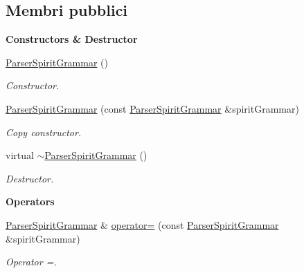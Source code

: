 \subsection*{Membri pubblici}
\begin{Indent}{\bf Constructors \& Destructor}\par
\begin{DoxyCompactItemize}
\item 
\hyperlink{classLifeV_1_1ParserSpiritGrammar_afd12d0ca36622930f0c5e574c96acaa7}{Parser\-Spirit\-Grammar} ()
\begin{DoxyCompactList}\small\item\em Constructor. \end{DoxyCompactList}\item 
\hyperlink{classLifeV_1_1ParserSpiritGrammar_a2a0d8a4396ae61a66edc4f320d9e79f5}{Parser\-Spirit\-Grammar} (const \hyperlink{classLifeV_1_1ParserSpiritGrammar}{Parser\-Spirit\-Grammar} \&spirit\-Grammar)
\begin{DoxyCompactList}\small\item\em Copy constructor. \end{DoxyCompactList}\item 
virtual \hyperlink{classLifeV_1_1ParserSpiritGrammar_a32c0629e6ee7ea37bb0b3159b0fa31ee}{$\sim$\-Parser\-Spirit\-Grammar} ()
\begin{DoxyCompactList}\small\item\em Destructor. \end{DoxyCompactList}\end{DoxyCompactItemize}
\end{Indent}
\begin{Indent}{\bf Operators}\par
\begin{DoxyCompactItemize}
\item 
\hyperlink{classLifeV_1_1ParserSpiritGrammar}{Parser\-Spirit\-Grammar} \& \hyperlink{classLifeV_1_1ParserSpiritGrammar_a6ce4fa32aacdc3bc7e4b38be901f94cf}{operator=} (const \hyperlink{classLifeV_1_1ParserSpiritGrammar}{Parser\-Spirit\-Grammar} \&spirit\-Grammar)
\begin{DoxyCompactList}\small\item\em Operator =. \end{DoxyCompactList}\end{DoxyCompactItemize}
\end{Indent}
